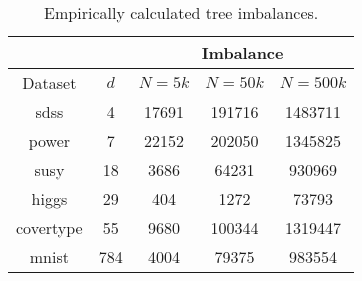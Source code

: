 \begin{table}[tb]
\begin{center}
\begin{tabular}{| c | c | c | c | c |}
\hline
 & & \multicolumn{3}{|c|}{Imbalance} \\
\hline
Dataset & $d$ & $N = 5k$ & $N = 50k$ & $N = 500k$ \\
\hline
sdss & 4 & 17691 & 191716 & 1483711 \\
power & 7 & 22152 & 202050 & 1345825 \\
susy & 18 & 3686 & 64231 & 930969 \\
higgs & 29 & 404 & 1272 & 73793 \\
covertype & 55 & 9680 & 100344 & 1319447 \\
mnist & 784 & 4004 & 79375 & 983554 \\
\hline
\end{tabular}
\end{center}
\caption{Empirically calculated tree imbalances.}
\label{tab:imbalance}
\end{table}



